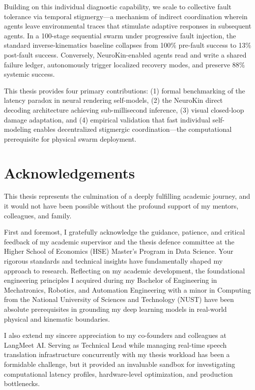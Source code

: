 \documentclass[12pt,a4paper,oneside]{report}
\begin{document}
Building on this individual diagnostic capability, we scale to collective fault tolerance via temporal stigmergy---a mechanism of indirect coordination wherein agents leave environmental traces that stimulate adaptive responses in subsequent agents. In a 100-stage sequential swarm under progressive fault injection, the standard inverse-kinematics baseline collapses from 100\% pre-fault success to 13\% post-fault success. Conversely, NeuroKin-enabled agents read and write a shared failure ledger, autonomously trigger localized recovery modes, and preserve 88\% systemic success.

This thesis provides four primary contributions: (1) formal benchmarking of the latency paradox in neural rendering self-models, (2) the NeuroKin direct decoding architecture achieving sub-millisecond inference, (3) visual closed-loop damage adaptation, and (4) empirical validation that fast individual self-modeling enables decentralized stigmergic coordination---the computational prerequisite for physical swarm deployment.

\clearpage

\chapter*{Acknowledgements}

This thesis represents the culmination of a deeply fulfilling academic journey, and it would not have been possible without the profound support of my mentors, colleagues, and family. 

First and foremost, I gratefully acknowledge the guidance, patience, and critical feedback of my academic supervisor and the thesis defence committee at the Higher School of Economics (HSE) Master's Program in Data Science. Your rigorous standards and technical insights have fundamentally shaped my approach to research. Reflecting on my academic development, the foundational engineering principles I acquired during my Bachelor of Engineering in Mechatronics, Robotics, and Automation Engineering with a minor in Computing from the National University of Sciences and Technology (NUST) have been absolute prerequisites in grounding my deep learning models in real-world physical and kinematic boundaries.

I also extend my sincere appreciation to my co-founders and colleagues at LangMeet AI. Serving as Technical Lead while managing real-time speech translation infrastructure concurrently with my thesis workload has been a formidable challenge, but it provided an invaluable sandbox for investigating computational latency profiles, hardware-level optimization, and production bottlenecks.
\end{document}

